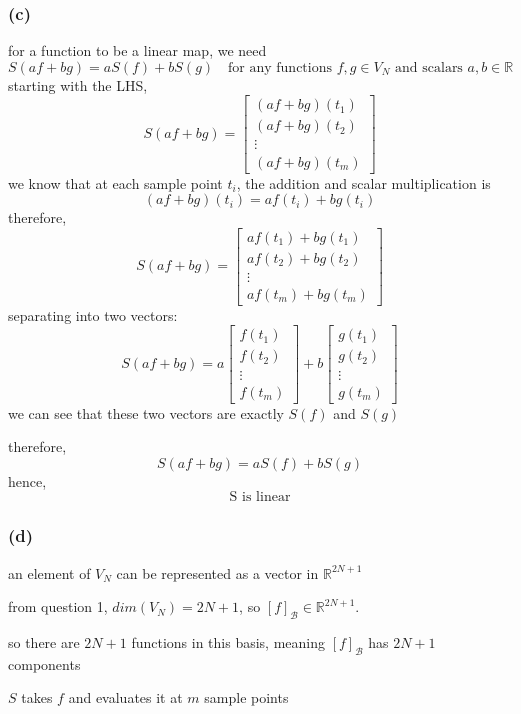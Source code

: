 \documentclass{article}
\begin{document}
\subsubsection*{(c)}
for a function to be a linear map, we need
\[
S(af+bg)=aS(f)+bS(g) \quad \text{for any functions } f, g \in V_N \text{ and scalars } a, b \in \mathbb{R}
\]
starting with the LHS,
\[
S(af+bg) = 
\begin{bmatrix}
    (af+bg)(t_1)\\
    (af+bg)(t_2)\\
    \vdots\\
    (af+bg)(t_m)
\end{bmatrix}
\]
we know that at each sample point $t_i$, the addition and scalar multiplication is
\[
(af+bg)(t_i)=af(t_i)+bg(t_i)
\]
therefore,
\[
S(af+bg) = 
\begin{bmatrix}
    af(t_1) + bg(t_1)\\
    af(t_2) + bg(t_2)\\
    \vdots\\
    af(t_m) + bg(t_m)
\end{bmatrix}
\]
separating into two vectors:
\[
S(af+bg) = 
a
\begin{bmatrix}
    f(t_1)\\
    f(t_2)\\
    \vdots\\
    f(t_m)
\end{bmatrix}
+
b
\begin{bmatrix}
    g(t_1)\\
    g(t_2)\\
    \vdots\\
    g(t_m)
\end{bmatrix}
\]
we can see that these two vectors are exactly $S(f)$ and $S(g)$

therefore, $$S(af+bg) = aS(f)+bS(g)$$
hence, $$\boxed{\text{S is linear}}$$

\subsubsection*{(d)}
an element of $V_N$ can be represented as a vector in $\mathbb{R}^{2N+1}$

from question 1, $dim(V_N)=2N+1$, so $[f]_\mathcal{B} \in \mathbb{R}^{2N+1}$.

so there are $2N+1$ functions in this basis, meaning $[f]_\mathcal{B}$ has $2N+1$ components

$S$ takes $f$ and evaluates it at $m$ sample points
\end{document}
